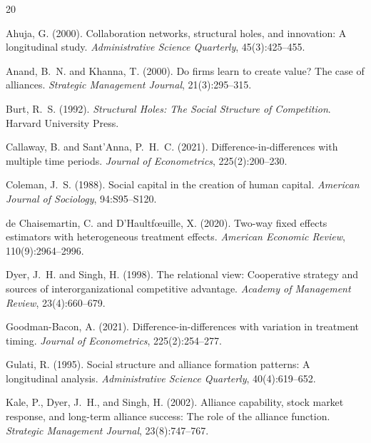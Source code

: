 \documentclass[11pt,letterpaper]{article}
\begin{document}

\begin{thebibliography}{20}

Ahuja, G. (2000).
\newblock Collaboration networks, structural holes, and innovation: A
longitudinal study.
\newblock \emph{Administrative Science Quarterly}, 45(3):425--455.

Anand, B.~N. and Khanna, T. (2000).
\newblock Do firms learn to create value? The case of alliances.
\newblock \emph{Strategic Management Journal}, 21(3):295--315.

Burt, R.~S. (1992).
\newblock \emph{Structural Holes: The Social Structure of Competition}.
Harvard University Press.

Callaway, B. and Sant'Anna, P.~H.~C. (2021).
\newblock Difference-in-differences with multiple time periods.
\newblock \emph{Journal of Econometrics}, 225(2):200--230.

Coleman, J.~S. (1988).
\newblock Social capital in the creation of human capital.
\newblock \emph{American Journal of Sociology}, 94:S95--S120.

de Chaisemartin, C. and D'Haultf{\oe}uille, X. (2020).
\newblock Two-way fixed effects estimators with heterogeneous
treatment effects.
\newblock \emph{American Economic Review}, 110(9):2964--2996.

Dyer, J.~H. and Singh, H. (1998).
\newblock The relational view: Cooperative strategy and sources of
interorganizational competitive advantage.
\newblock \emph{Academy of Management Review}, 23(4):660--679.

Goodman-Bacon, A. (2021).
\newblock Difference-in-differences with variation in treatment
timing.
\newblock \emph{Journal of Econometrics}, 225(2):254--277.

Gulati, R. (1995).
\newblock Social structure and alliance formation patterns: A
longitudinal analysis.
\newblock \emph{Administrative Science Quarterly}, 40(4):619--652.

Kale, P., Dyer, J.~H., and Singh, H. (2002).
\newblock Alliance capability, stock market response, and long-term
alliance success: The role of the alliance function.
\newblock \emph{Strategic Management Journal}, 23(8):747--767.


\end{thebibliography}
\end{document}
